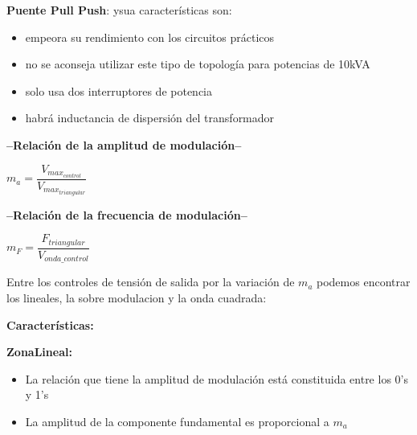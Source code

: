 \documentclass[a3paper,12pt]{article}
\begin{document}
{\begin{flushleft}
{\textbf{Puente Pull Push}: ysua características son:\\
	\begin{itemize}
	\item empeora su rendimiento con los circuitos prácticos 
	\item no se aconseja utilizar este tipo de topología para potencias de 10kVA
	\item solo usa dos interruptores de potencia 
	\item habrá inductancia de dispersión del transformador
	\end{itemize}
		}
		 	\vspace{1.5cm}
\begin{center}
\begin{Huge}
\textbf{--Relación de la amplitud de modulación--}
\\
\vspace{1cm}
\end{Huge}
	\begin{huge}
		$m_a = \dfrac{V_{max_{ control}}}{V_{max_{ triangular}}}$
	\end{huge}
\end{center}

\begin{center}
\begin{Huge}
\textbf{--Relación de la frecuencia de modulación--}
\\
\vspace{1cm}
\end{Huge}
	\begin{huge}
		$m_F = \dfrac{F_{triangular}}{V_{onda\_control}}$
	\end{huge}
\end{center}
		 	
\vspace{1cm}

\begin{LARGE}
Entre los controles de tensión de salida por la variación de $m_a$ podemos encontrar los lineales, la sobre modulacion y la onda cuadrada:
\end{LARGE}

\vspace{.5cm}

\begin{Huge}
	 \textbf{Características:}
\end{Huge}

\vspace{.5cm}

\begin{huge}
\hspace{3cm}\textbf{ZonaLineal:}
\end{huge}
\begin{LARGE}
 \begin{itemize}
 	\item La relación que tiene la amplitud de modulación está constituida entre los 0's y 1's
 	\item La amplitud de la componente fundamental es proporcional a $m_a$\\
 

\end{itemize}
\end{LARGE}
\end{flushleft}}
\end{document}
